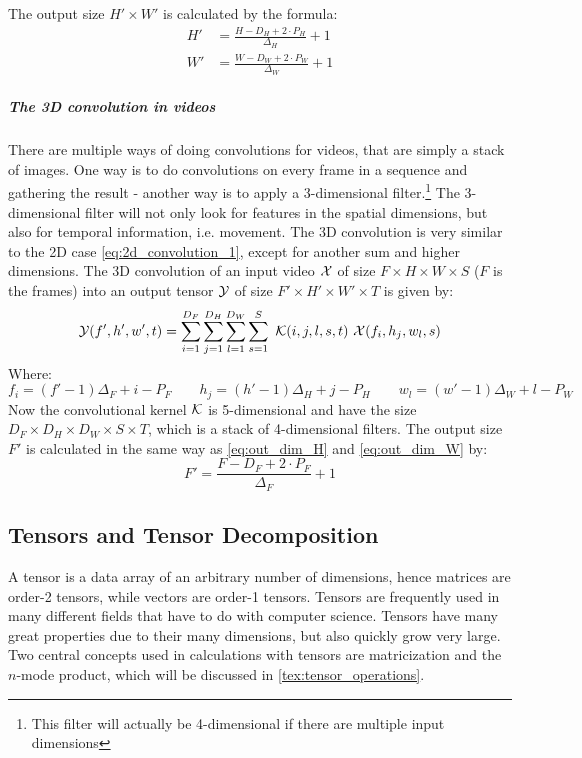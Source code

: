 The output size $H' \times W'$ is calculated by the formula:
\begin{align}
    H' &= \frac{H - D_H + 2\cdot P_H}{\Delta_H} + 1 \label{eq:out_dim_H}\\
    W' &= \frac{W - D_W + 2\cdot P_W}{\Delta_W} + 1 \label{eq:out_dim_W}
\end{align}
\subparagraph{The 3D convolution in videos}
There are multiple ways of doing convolutions for videos, that are simply a stack of images. One way is to do convolutions on every frame in a sequence and gathering the result - another way is to apply a 3-dimensional filter.\footnote{This filter will actually be 4-dimensional if there are multiple input dimensions} The 3-dimensional filter will not only look for features in the spatial dimensions, but also for temporal information, i.e. movement. The 3D convolution is very similar to the 2D case \eqref{eq:2d_convolution_1}, except for another sum and higher dimensions. The 3D convolution of an input video $\mathcal{X}$ of size $F\times H \times W \times S$ ($F$ is the frames) into an output tensor $\mathcal{Y}$ of size $F'\times H' \times W' \times T$ is given by:
\begin{equation}
    \tensor{Y}(f', h', w', t) = \sum_{i=1}^{D_F} \sum_{j=1}^{D_H} \sum_{l=1}^{D_W} \sum_{s=1}^{S} \ \tensor{K}(i, j, l, s, t) \ \tensor{X}(f_i, h_j, w_l, s)
\end{equation}
Where:
\begin{equation}
    f_i = \left(f' - 1\right) \Delta_F + i - P_F \qquad h_j =  \left(h' - 1\right) \Delta_H + j - P_H \qquad w_l =  \left(w' - 1\right) \Delta_W + l - P_W
\end{equation}
Now the convolutional kernel $\mathcal{K}$ is 5-dimensional and have the size $D_F \times D_H \times D_W \times S \times T$, which is a stack of 4-dimensional filters. The output size $F'$ is calculated in the same way as \eqref{eq:out_dim_H} and \eqref{eq:out_dim_W} by:
\begin{equation}
    F' = \frac{F - D_F + 2\cdot P_F}{\Delta_F} + 1
    \label{eq:out_dim_F}
\end{equation}


\subsection{Tensors and Tensor Decomposition}\label{tex:decomp_methods}
A tensor is a data array of an arbitrary number of dimensions, hence matrices are order-2 tensors, while vectors are order-1 tensors. Tensors are frequently used in many different fields that have to do with computer science\cite{Mørup2011}. Tensors have many great properties due to their many dimensions, but also quickly grow very large. Two central concepts used in calculations with tensors are matricization and the $n$-mode product, which will be discussed in \autoref{tex:tensor_operations}.

